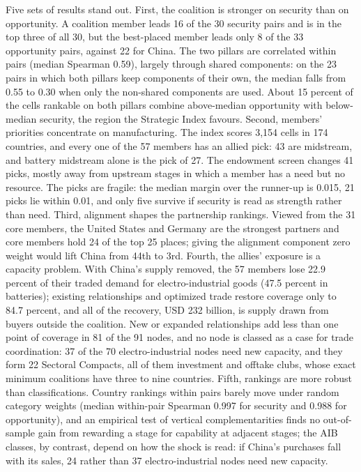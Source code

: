 Five sets of results stand out. First, the coalition is stronger on security than on opportunity.
A coalition member leads 16 of the 30 security pairs and is in the top three of all 30, but the
best-placed member leads only 8 of the 33 opportunity pairs, against 22 for China. The two
pillars are correlated within pairs (median Spearman 0.59), largely through shared components:
on the 23 pairs in which both pillars keep components of their own, the median falls from 0.55
to 0.30 when only the non-shared components are used. About 15 percent of
the cells rankable on both pillars combine above-median opportunity with below-median security,
the region the Strategic Index favours. Second, members' priorities concentrate on manufacturing.
The index scores 3,154 cells in 174 countries, and every one of the 57 members has an allied
pick: 43 are midstream, and battery midstream alone is the pick of 27. The endowment screen
changes 41 picks, mostly away from upstream stages in which a member has a need but no resource.
The picks are fragile: the median margin over the runner-up is 0.015, 21 picks lie within 0.01,
and only five survive if security is read as strength rather than need. Third, alignment shapes
the partnership rankings. Viewed from the 31 core members, the United States and Germany are the
strongest partners and core members hold 24 of the top 25 places; giving the alignment component
zero weight would lift China from 44th to 3rd. Fourth, the allies' exposure is a capacity problem.
With China's supply removed, the 57 members lose 22.9 percent of their traded demand for
electro-industrial goods (47.5 percent in batteries); existing relationships and optimized trade
restore coverage only to 84.7 percent, and all of the recovery, USD 232 billion, is supply drawn
from buyers outside the coalition. New or expanded relationships add less than one point of coverage in
81 of the 91 nodes, and no node is classed as a case for trade coordination: 37 of the 70 electro-industrial nodes
need new capacity, and they form 22 Sectoral Compacts, all of them investment and offtake clubs, whose
exact minimum coalitions have three to nine countries. Fifth, rankings are more robust than
classifications. Country rankings within pairs barely move under random category weights (median
within-pair Spearman 0.997 for security and 0.988 for opportunity), and an empirical test of vertical
complementarities finds no out-of-sample gain from rewarding a stage for capability at adjacent
stages; the AIB classes, by contrast, depend on how the shock is read: if China's purchases fall with
its sales, 24 rather than 37 electro-industrial nodes need new capacity.

